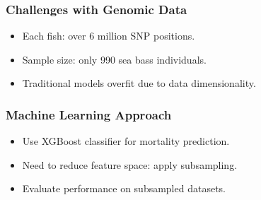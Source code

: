\documentclass[aspectratio=169]{beamer}
\begin{document}
\begin{frame}
\frametitle{Challenges with Genomic Data}
\begin{itemize}
  \item Each fish: over 6 million SNP positions.
  \item Sample size: only 990 sea bass individuals.
  \item Traditional models overfit due to data dimensionality.
\end{itemize}
\end{frame}

\begin{frame}
\frametitle{Machine Learning Approach}
\begin{itemize}
  \item Use XGBoost classifier for mortality prediction.
  \item Need to reduce feature space: apply subsampling.
  \item Evaluate performance on subsampled datasets.
\end{itemize}
\end{frame}
\end{document}
